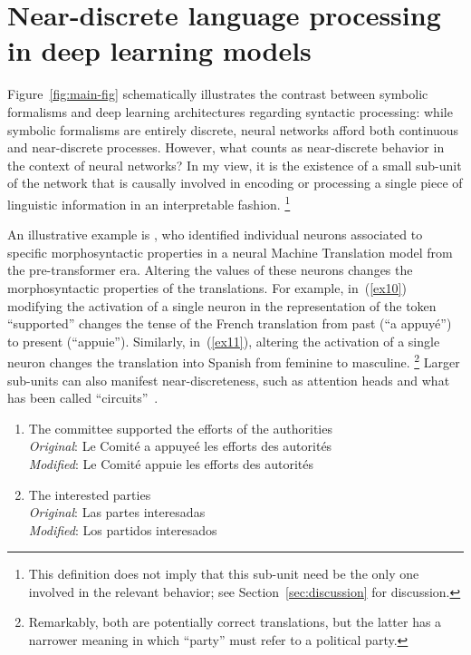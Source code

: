 \section{Near-discrete language processing in deep learning models}
\label{sec:syntax}



Figure~\ref{fig:main-fig} schematically illustrates the contrast between symbolic formalisms and deep learning architectures regarding syntactic processing: while symbolic formalisms are entirely discrete, neural networks afford both continuous and near-discrete processes.
However, what counts as near-discrete behavior in the context of neural networks?
In my view, it is the existence of a small sub-unit of the network that is causally involved in encoding or processing a single piece of linguistic information in an interpretable fashion.
\footnote{This definition does not imply that this sub-unit need be the only one involved in the relevant behavior; see Section~\ref{sec:discussion} for discussion.}

An illustrative example is \citet{bau2019identifying}, who identified individual neurons associated to specific morphosyntactic properties in a neural Machine Translation model from the pre-transformer era.
Altering the values of these neurons changes the morphosyntactic properties of the translations.
For example, in~(\ref{ex10}) modifying the activation of a single neuron in the representation of the token ``supported'' changes the tense of the French translation from past (``a appuyé'') to present (``appuie'').
Similarly, in~(\ref{ex11}), altering the activation of a single neuron changes the translation into Spanish from feminine to masculine.
\footnote{Remarkably, both are potentially correct translations, but the latter has a narrower meaning in which ``party'' must refer to a political party.}
Larger sub-units can also manifest near-discreteness, such as attention heads and what has been called ``circuits''~\cite[subgraphs within neural networks;][]{cammarata2020thread:}.

\renewcommand{\labelenumi}{(\theenumi)}
\begin{enumerate}[resume]
\item \label{ex10} The committee supported the efforts of the authorities\\
  \textit{Original}: Le Comité a appuyeé les efforts des autorités\\
  \textit{Modified}: Le Comité appuie les efforts des autorités
\item \label{ex11} The interested parties\\
  \textit{Original}: Las partes interesadas\\
  \textit{Modified}: Los partidos interesados
\end{enumerate}

